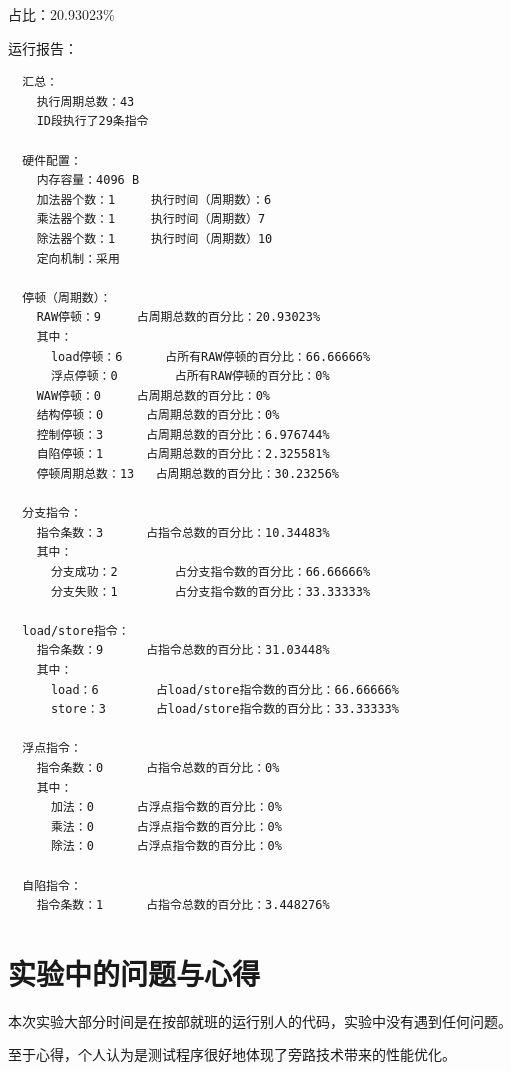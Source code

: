 \documentclass[blue,normal,cn]{elegantnote}
\begin{document}
\begin{enumerate}[wide=0pt, listparindent=2em, parsep=0pt]
\begin{itemize}[leftmargin=3em, listparindent=2em, parsep=0pt]
                \textcolor{ans} {占比：20.93023\%}

                \textcolor{ans}{运行报告：}
                \begin{lstlisting}
  汇总：
    执行周期总数：43
    ID段执行了29条指令

  硬件配置：
    内存容量：4096 B
    加法器个数：1		执行时间（周期数）：6
    乘法器个数：1		执行时间（周期数）7		
    除法器个数：1		执行时间（周期数）10		
    定向机制：采用

  停顿（周期数）：
    RAW停顿：9		占周期总数的百分比：20.93023%
    其中：
      load停顿：6		占所有RAW停顿的百分比：66.66666%
      浮点停顿：0		占所有RAW停顿的百分比：0%
    WAW停顿：0		占周期总数的百分比：0%
    结构停顿：0		占周期总数的百分比：0%
    控制停顿：3		占周期总数的百分比：6.976744%
    自陷停顿：1		占周期总数的百分比：2.325581%
    停顿周期总数：13	占周期总数的百分比：30.23256%

  分支指令：
    指令条数：3		占指令总数的百分比：10.34483%
    其中：
      分支成功：2		占分支指令数的百分比：66.66666%
      分支失败：1		占分支指令数的百分比：33.33333%

  load/store指令：
    指令条数：9		占指令总数的百分比：31.03448%
    其中：
      load：6		占load/store指令数的百分比：66.66666%
      store：3		占load/store指令数的百分比：33.33333%

  浮点指令：
    指令条数：0		占指令总数的百分比：0%
    其中：
      加法：0		占浮点指令数的百分比：0%
      乘法：0		占浮点指令数的百分比：0%
      除法：0		占浮点指令数的百分比：0%

  自陷指令：
    指令条数：1		占指令总数的百分比：3.448276%
\end{lstlisting}
        \end{itemize}
\end{enumerate}

\section{实验中的问题与心得}

本次实验大部分时间是在按部就班的运行别人的代码，实验中没有遇到任何问题。

至于心得，个人认为是测试程序很好地体现了旁路技术带来的性能优化。
\end{document}
